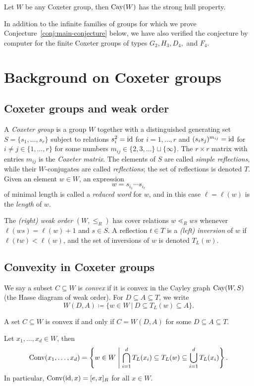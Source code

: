 \begin{conj}
\label{conj:main-conjecture}
Let $W$ be any Coxeter group, then $\operatorname{Cay}(W)$ has the strong hull property.
\end{conj}

In addition to the infinite families of groups for which we prove Conjecture~\ref{conj:main-conjecture} below, we have also verified the conjecture by computer for the finite Coxeter groups of types $G_2, H_3, D_4,$ and $F_4$.

\section{Background on Coxeter groups}
\label{sec:coxeter-background}

\subsection{Coxeter groups and weak order}
A \emph{Coxeter group} is a group $W$ together with a distinguished generating set $S=\{s_1,\ldots,s_r\}$ subject to relations $s_i^2=\operatorname{id}$ for $i=1,\ldots,r$ and $(s_is_j)^{m_{ij}}=\operatorname{id}$ for $i\neq j \in \{1, \ldots, r\}$ for some numbers $m_{ij} \in \{2,3,\ldots\} \sqcup \{\infty\}$.  The $r \times r$ matrix with entries $m_{ij}$ is the \emph{Coxeter matrix}. The elements of $S$ are called \emph{simple reflections}, while their $W$-conjugates are called \emph{reflections}; the set of reflections is denoted $T$.  Given an element $w \in W$, an expression
\[
w=s_{i_1}\cdots s_{i_{\ell}}
\]
of minimal length is called a \emph{reduced word} for $w$, and in this case $\ell=\ell(w)$ is the \emph{length} of $w$.

The \emph{(right) weak order} $(W, \leq_R)$ has cover relations $w \lessdot_R ws$ whenever $\ell(ws)=\ell(w)+1$ and $s \in S$.  A reflection $t \in T$ is a \emph{(left) inversion} of $w$ if $\ell(tw)<\ell(w)$, and the set of inversions of $w$ is denoted $T_L(w)$.

\subsection{Convexity in Coxeter groups}
We say a subset $C \subseteq W$ is \emph{convex} if it is convex in the Cayley graph $\operatorname{Cay}(W,S)$ (the Hasse diagram of weak order).  For $D \subseteq A \subseteq T$, we write 
\[
W(D,A) \coloneqq \{w \in W \: | \: D \subseteq T_L(w) \subseteq A\}.
\]

\begin{theorem}
\label{thm:tits-convexity}
A set $C \subseteq W$ is convex if and only if $C=W(D,A)$ for some $D \subseteq A \subseteq T$.
\end{theorem}

\begin{prop}
\label{prop:convex-hull-from-inversions}
Let $x_1, \ldots, x_d \in W$, then 
\[
\operatorname{Conv}(x_1, \ldots, x_d) =\left\{ w \in W \; \middle| \; \bigcap_{i=1}^d T_L(x_i) \subseteq T_L(w) \subseteq \bigcup_{i=1}^d T_L(x_i)\right\}.
\]
In particular, $\operatorname{Conv}(\operatorname{id},x)=[e,x]_R$ for all $x \in W$.
\end{prop}
